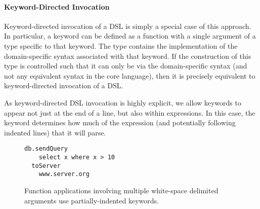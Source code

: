 \paragraph{Keyword-Directed Invocation}
Keyword-directed invocation of a DSL is simply a special case of this approach. In particular, a keyword can be defined as a function with a single argument of a type specific to that keyword. The type contains the implementation of the domain-specific syntax associated with that keyword. If the construction of this type is controlled such that it can only be via the domain-specific syntax (and not any equivalent syntax in the core language), then it is precisely equivalent to keyword-directed invocation of a DSL.

As keyword-directed DSL invocation is highly explicit, we allow keywords to appear not just at the end of a line, but also within expressions.  In this case, the keyword determines how much of the expression (and potentially following indented lines) that it will parse.


\begin{figure}
\centering
\begin{lstlisting}
db.sendQuery
    select x where x > 10
  toServer
    www.server.org
\end{lstlisting}
\caption{Function applications involving multiple white-space delimited arguments use partially-indented keywords.}
\label{f:dsl-multi}
\end{figure}
%
%
